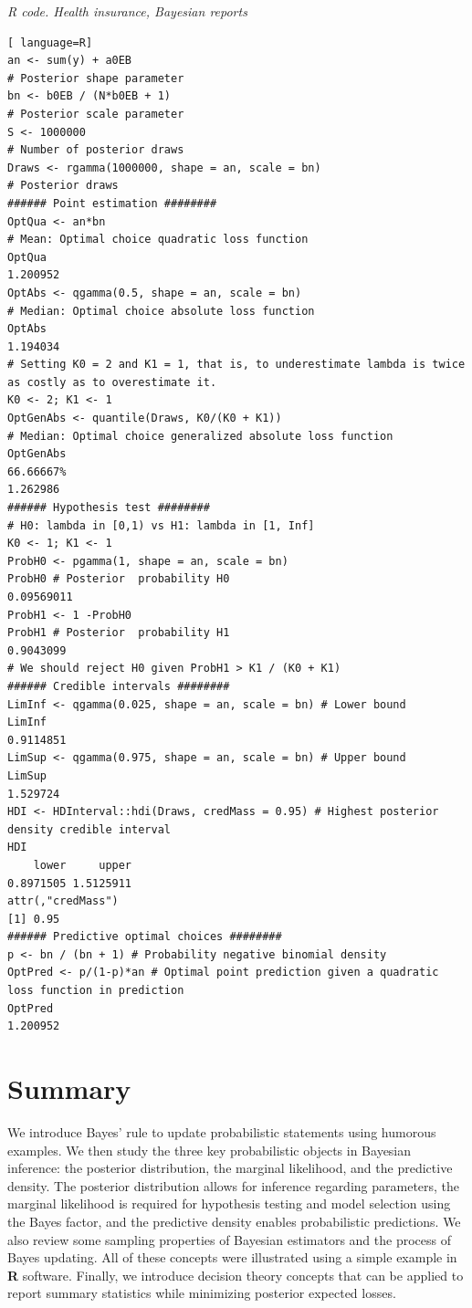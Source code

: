 \begin{tcolorbox}[enhanced,width=4.67in,center upper,
	fontupper=\large\bfseries,drop shadow southwest,sharp corners]
	\textit{R code. Health insurance, Bayesian reports}
\begin{VF}
\begin{lstlisting}[ language=R]
an <- sum(y) + a0EB 
# Posterior shape parameter
bn <- b0EB / (N*b0EB + 1) 
# Posterior scale parameter
S <- 1000000 
# Number of posterior draws
Draws <- rgamma(1000000, shape = an, scale = bn) 
# Posterior draws
###### Point estimation ########
OptQua <- an*bn 
# Mean: Optimal choice quadratic loss function
OptQua
1.200952
OptAbs <- qgamma(0.5, shape = an, scale = bn) 
# Median: Optimal choice absolute loss function
OptAbs
1.194034
# Setting K0 = 2 and K1 = 1, that is, to underestimate lambda is twice as costly as to overestimate it.
K0 <- 2; K1 <- 1
OptGenAbs <- quantile(Draws, K0/(K0 + K1)) 
# Median: Optimal choice generalized absolute loss function
OptGenAbs
66.66667% 
1.262986 
###### Hypothesis test ########
# H0: lambda in [0,1) vs H1: lambda in [1, Inf]
K0 <- 1; K1 <- 1
ProbH0 <- pgamma(1, shape = an, scale = bn) 
ProbH0 # Posterior  probability H0
0.09569011
ProbH1 <- 1 -ProbH0
ProbH1 # Posterior  probability H1
0.9043099
# We should reject H0 given ProbH1 > K1 / (K0 + K1) 
###### Credible intervals ########
LimInf <- qgamma(0.025, shape = an, scale = bn) # Lower bound
LimInf
0.9114851
LimSup <- qgamma(0.975, shape = an, scale = bn) # Upper bound
LimSup
1.529724
HDI <- HDInterval::hdi(Draws, credMass = 0.95) # Highest posterior density credible interval
HDI
    lower     upper 
0.8971505 1.5125911 
attr(,"credMass")
[1] 0.95
###### Predictive optimal choices ########
p <- bn / (bn + 1) # Probability negative binomial density
OptPred <- p/(1-p)*an # Optimal point prediction given a quadratic loss function in prediction
OptPred
1.200952
\end{lstlisting}
\end{VF}
\end{tcolorbox}

\section{Summary}
We introduce Bayes' rule to update probabilistic statements using humorous examples. We then study the three key probabilistic objects in Bayesian inference: the posterior distribution, the marginal likelihood, and the predictive density. The posterior distribution allows for inference regarding parameters, the marginal likelihood is required for hypothesis testing and model selection using the Bayes factor, and the predictive density enables probabilistic predictions. We also review some sampling properties of Bayesian estimators and the process of Bayes updating. All of these concepts were illustrated using a simple example in \textbf{R} software. Finally, we introduce decision theory concepts that can be applied to report summary statistics while minimizing posterior expected losses.
 
